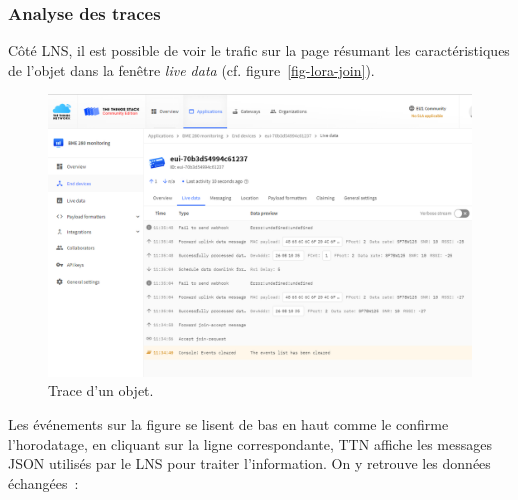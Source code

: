 \subsubsection{Analyse des traces}

Côté LNS, il est possible de voir le trafic sur la page résumant les caractéristiques de l'objet dans la fenêtre \textit{live data} (cf. figure~\vref{fig-lora-join}).

\begin{figure}[tbp]
\centerline{\includegraphics[width=.7\columnwidth]{Pictures/lora-join.png} }
\caption{Trace d'un objet.}
\label{fig-lora-join}
\end{figure}

Les événements sur la figure se lisent de bas en haut comme le confirme l'horodatage, en cliquant sur la ligne correspondante, TTN affiche les messages JSON utilisés par le LNS pour traiter l'information. On y retrouve les données échangées~:


